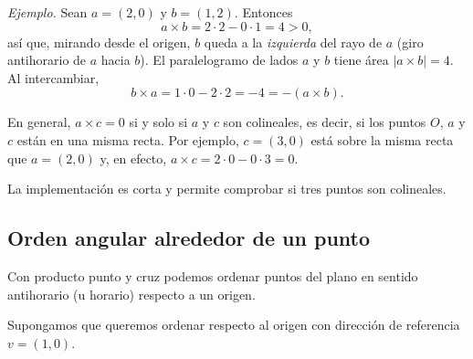 \textit{Ejemplo.} Sean $a=(2,0)$ y $b=(1,2)$. Entonces
\[
a \times b = 2\cdot 2 - 0\cdot 1 = 4 > 0,
\]
así que, mirando desde el origen, $b$ queda a la \emph{izquierda} del rayo de $a$ (giro antihorario de $a$ hacia $b$). El paralelogramo de lados $a$ y $b$ tiene área $|a\times b|=4$. Al intercambiar,
\[
b \times a = 1\cdot 0 - 2\cdot 2 = -4 = -(a\times b).
\]
\begin{center}
\end{center}
En general, $a\times c=0$ si y solo si $a$ y $c$ son colineales, es decir, si los puntos $O$, $a$ y $c$ están en una misma recta. Por ejemplo, $c=(3,0)$ está sobre la misma recta que $a=(2,0)$ y, en efecto, $a\times c = 2\cdot 0 - 0\cdot 3 = 0$.

La implementación es corta y permite comprobar si tres puntos son colineales.



\subsection*{Orden angular alrededor de un punto}

Con producto punto y cruz podemos ordenar puntos del plano en sentido antihorario (u horario) respecto a un origen.

Supongamos que queremos ordenar respecto al origen con dirección de referencia $v=(1,0)$.

